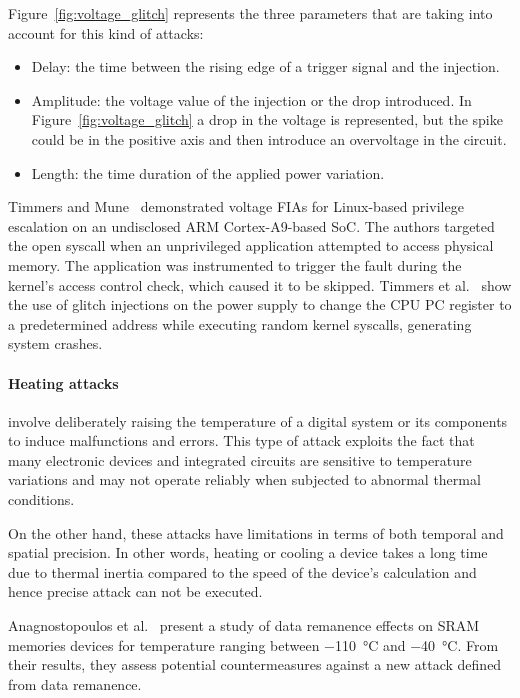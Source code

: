 Figure~\ref{fig:voltage_glitch} represents the three parameters that are taking into account for this kind of attacks:
\begin{itemize}
    \item Delay: the time between the rising edge of a trigger signal and the injection.
    \item Amplitude: the voltage value of the injection or the drop introduced. In Figure~\ref{fig:voltage_glitch} a drop in the voltage is represented, but the spike could be in the positive axis and then introduce an overvoltage in the circuit.
    \item Length: the time duration of the applied power variation.
\end{itemize}

Timmers and Mune~\cite{TM-17-fdtc} demonstrated voltage FIAs for Linux-based privilege escalation on an undisclosed ARM Cortex-A9-based SoC. The authors targeted the open syscall when an unprivileged application attempted to access physical memory. The application was instrumented to trigger the fault during the kernel’s access control check, which caused it to be skipped.
Timmers et al.~\cite{TSW-16-fdtc} show the use of glitch injections on the power supply to change the CPU PC register to a predetermined address while executing random kernel syscalls, generating system crashes.

\paragraph{Heating attacks} involve deliberately raising the temperature of a digital system or its components to induce malfunctions and errors. This type of attack exploits the fact that many electronic devices and integrated circuits are sensitive to temperature variations and may not operate reliably when subjected to abnormal thermal conditions.

On the other hand, these attacks have limitations in terms of both temporal and spatial precision. In other words, heating or cooling a device takes a long time due to thermal inertia compared to the speed of the device's calculation and hence precise attack can not be executed.

Anagnostopoulos et al.~\cite{AARSGK-18-dsd} present a study of data remanence effects on SRAM memories devices for temperature ranging between \SI{-110}{\degreeCelsius} and \SI{-40}{\degreeCelsius}. From their results, they assess potential countermeasures against a new attack defined from data remanence.

